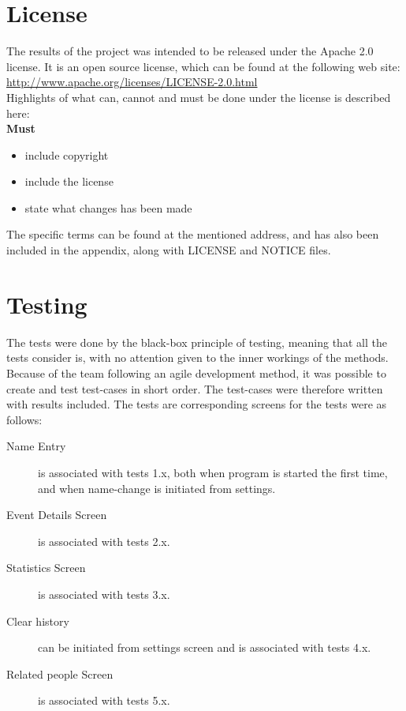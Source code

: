 \section{License}
The results of the project was intended to be released under the Apache 2.0 license. It is an open source license, which can be found  at the following web site: \url{http://www.apache.org/licenses/LICENSE-2.0.html}\\
Highlights of what can, cannot and must be done under the license is described here:\\
\textbf{Must}
\begin{itemize}
\item include copyright
\item include the license
\item state what changes has been made
\end{itemize}
The specific terms can be found at the mentioned address, and has also been included in the appendix, along with LICENSE and NOTICE files.

\section{Testing}
The tests were done by the black-box principle of testing, meaning that all the tests consider is, with no attention given to the inner workings of the methods. Because of the team following an agile development method, it was possible to create and test test-cases in short order. The test-cases were therefore written with results included.
The tests are corresponding screens for the tests were as follows:
\begin{description}
\item[Name Entry] is associated with tests 1.x, both when program is started the first time, and when name-change is initiated from settings.
\item[Event Details Screen] is associated with tests 2.x.
\item[Statistics Screen] is associated with tests 3.x.
\item[Clear history] can be initiated from settings screen and is associated with tests 4.x.
\item[Related people Screen] is associated with tests 5.x. 
\end{description}

